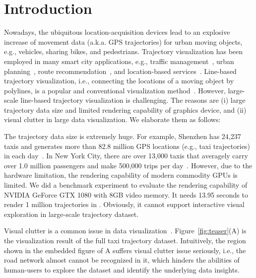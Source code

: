 \section{Introduction}\label{sec:intro}
Nowadays, the {ubiquitous} location-acquisition devices lead to an explosive increase of movement data (a.k.a. GPS trajectories) {for} urban moving objects, e.g., {vehicles}, sharing bikes, and pedestrians.
Trajectory {visualization has} been employed in many smart city applications, e.g.,  traffic management~\cite{wang2014visual}, urban planning~\cite{tang2017efficient}, route recommendation~\cite{zheng2011learning}, and location-based services~\cite{liu2016smartadp, zheng2010collaborative}.
Line-based trajectory visualization, i.e., connecting the {locations} of a {moving} object by polylines, is a popular and conventional visualization method~\cite{chen2015survey}.
However, {large-scale} line-based trajectory visualization is challenging.
The reasons are (i) large trajectory data size and limited rendering capability of graphics device, and (ii) visual clutter in large data visualization.
We elaborate them as follows:

The trajectory data size is extremely huge.
For example, Shenzhen has 24,237 taxis and generates more than 82.8 million GPS locations (e.g., taxi trajectories) in each day~\cite{sz}.
In New York City, {there are} over 13,000 taxis {that} averagely {carry} over 1.0 million passengers and make 500,000 trips per day~\cite{ferreira2013visual}.
However, due to the hardware limitation, the rendering capability of modern commodity GPUs is limited.
We did a benchmark experiment to evaluate the rendering capability of NVIDIA GeForce GTX 1080 with 8GB video memory.
It needs 13.95 seconds to render 1 million trajectories in \pt{}. %
Obviously, it cannot support interactive visual exploration in large-scale trajectory dataset.

Visual clutter is a common issue in data visualization~\cite{clutter}.
Figure~\ref{fig:teaser}(A) is the visualization result of the full \pt{} taxi trajectory dataset.
Intuitively, the region shown in the embedded figure of A suffers visual clutter issue seriously,
i.e., the road network almost cannot be recognized in it,
which hinders the abilities of human-users to explore the dataset and identify the underlying data insights.



